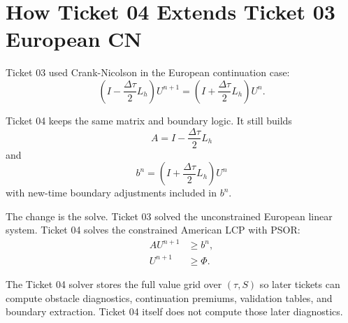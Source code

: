 \documentclass[11pt,a4paper]{article}
\begin{document}
\section{How Ticket 04 Extends Ticket 03 European CN}

Ticket 03 used Crank-Nicolson in the European continuation case:
\begin{equation}
  \left(I-\frac{\Delta\tau}{2}L_h\right)U^{n+1}
  =
  \left(I+\frac{\Delta\tau}{2}L_h\right)U^n.
\end{equation}

Ticket 04 keeps the same matrix and boundary logic. It still builds
\begin{equation}
  A = I-\frac{\Delta\tau}{2}L_h
\end{equation}
and
\begin{equation}
  b^n = \left(I+\frac{\Delta\tau}{2}L_h\right)U^n
\end{equation}
with new-time boundary adjustments included in \(b^n\).

The change is the solve. Ticket 03 solved the unconstrained European linear system. Ticket 04
solves the constrained American LCP with PSOR:
\begin{align}
  A U^{n+1} &\geq b^n, \\
  U^{n+1} &\geq \Phi.
\end{align}

The Ticket 04 solver stores the full value grid over \((\tau,S)\) so later tickets can compute
obstacle diagnostics, continuation premiums, validation tables, and boundary extraction. Ticket
04 itself does not compute those later diagnostics.
\end{document}
